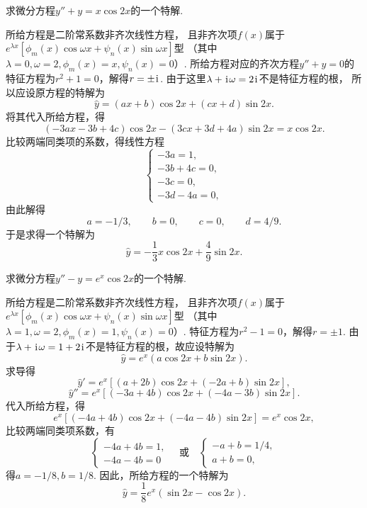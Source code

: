 \begin{example}
求微分方程\(y'' + y = x \cos2x\)的一个特解.
\begin{solution}
所给方程是二阶常系数非齐次线性方程，
且非齐次项\(f(x)\)属于\(e^{\lambda x} [\phi_m(x) \cos\omega x + \psi_n(x) \sin\omega x]\)型
（其中\(\lambda=0,
\omega=2,
\phi_m(x) = x,
\psi_n(x) = 0\)）.
所给方程对应的齐次方程\(y''+y=0\)的特征方程为\(r^2+1=0\)，解得\(r=\pm\kern1pt\mathrm{i}\kern1pt\).
由于这里\(\lambda+\kern1pt\mathrm{i}\kern1pt\omega=2\kern1pt\mathrm{i}\kern1pt\)不是特征方程的根，
所以应设原方程的特解为\[
	\hat{y} = (ax+b) \cos2x + (cx+d) \sin2x.
\]
将其代入所给方程，得\[
	(-3ax-3b+4c) \cos2x - (3cx+3d+4a) \sin2x = x \cos2x.
\]
比较两端同类项的系数，得线性方程\[
	\left\{ \begin{array}{l}
		-3a=1, \\
		-3b+4c=0, \\
		-3c=0, \\
		-3d-4a=0,
	\end{array} \right.
\]
由此解得\[
	a = -1/3, \qquad
	b = 0, \qquad
	c = 0, \qquad
	d = 4/9.
\]
于是求得一个特解为\[
	\hat{y} = -\frac{1}{3} x\cos2x + \frac{4}{9} \sin2x.
\]
\end{solution}
\end{example}

\begin{example}
求微分方程\(y'' - y = e^x \cos2x\)的一个特解.
\begin{solution}
所给方程是二阶常系数非齐次线性方程，
且非齐次项\(f(x)\)属于\(e^{\lambda x} [\phi_m(x) \cos\omega x + \psi_n(x) \sin\omega x]\)型
（其中\(\lambda=1,
\omega=2,
\phi_m(x) = 1,
\psi_n(x) = 0\)）.
特征方程为\(r^2-1=0\)，解得\(r=\pm1\).
由于\(\lambda+\kern1pt\mathrm{i}\kern1pt\omega=1+2\kern1pt\mathrm{i}\kern1pt\)不是特征方程的根，故应设特解为\[
	\hat{y} = e^x (a \cos2x + b \sin2x).
\]
求导得\[
	\hat{y}' = e^x [(a+2b) \cos2x + (-2a+b) \sin2x],
\]\[
	\hat{y}'' = e^x [(-3a+4b) \cos2x + (-4a-3b) \sin2x].
\]
代入所给方程，得\[
	e^x [(-4a+4b) \cos2x + (-4a-4b) \sin2x]
	= e^x \cos2x,
\]
比较两端同类项系数，有\[
	\left\{ \begin{array}{l}
		-4a+4b=1, \\
		-4a-4b=0
	\end{array} \right.
	\quad\text{或}\quad
	\left\{ \begin{array}{l}
		-a+b=1/4, \\
		a+b=0,
	\end{array} \right.
\]
得\(a = -1/8,
b = 1/8\).
因此，所给方程的一个特解为\[
	\hat{y} = \frac{1}{8} e^x (\sin2x - \cos2x).
\]
\end{solution}
\end{example}

